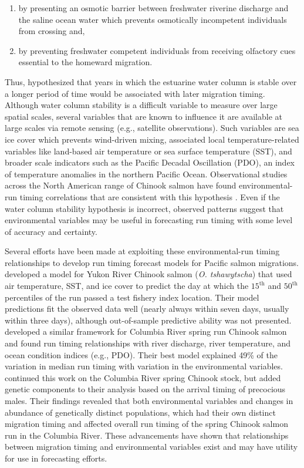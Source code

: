 \documentclass[12pt,]{book}
\providecommand{\tightlist}{%
  \setlength{\itemsep}{0pt}\setlength{\parskip}{0pt}}
\theoremstyle{definition}
\theoremstyle{definition}
\theoremstyle{definition}
\theoremstyle{remark}
\begin{document}
\begin{enumerate}
\def\labelenumi{(\arabic{enumi})}
\tightlist
\item
  by presenting an osmotic barrier between freshwater riverine discharge
  and the saline ocean water which prevents osmotically incompetent
  individuals from crossing and,
\item
  by preventing freshwater competent individuals from receiving
  olfactory cues essential to the homeward migration.
\end{enumerate}

\noindent
Thus, \citet{mundy-evenson-2011} hypothesized that years in which the
estuarine water column is stable over a longer period of time would be
associated with later migration timing. Although water column stability
is a difficult variable to measure over large spatial scales, several
variables that are known to influence it are available at large scales
via remote sensing (e.g., satellite observations). Such variables are
sea ice cover which prevents wind-driven mixing, associated local
temperature-related variables like land-based air temperature or sea
surface temperature (SST), and broader scale indicators such as the
Pacific Decadal Oscillation (PDO), an index of temperature anomalies in
the northern Pacific Ocean. Observational studies across the North
American range of Chinook salmon have found environmental-run timing
correlations that are consistent with this hypothesis
\citep{hodgson-etal-2006, keefer-etal-2008, mundy-evenson-2011}. Even if
the water column stability hypothesis is incorrect, observed patterns
suggest that environmental variables may be useful in forecasting run
timing with some level of accuracy and certainty.

Several efforts have been made at exploiting these environmental-run
timing relationships to develop run timing forecast models for Pacific
salmon migrations. \citet{mundy-evenson-2011} developed a model for
Yukon River Chinook salmon (\emph{O. tshawytscha}) that used air
temperature, SST, and ice cover to predict the day at which the
\(15^{\text{th}}\) and \(50^{\text{th}}\) percentiles of the run passed
a test fishery index location. Their model predictions fit the observed
data well (nearly always within seven days, usually within three days),
although out-of-sample predictive ability was not presented.
\citet{keefer-etal-2008} developed a similar framework for Columbia
River spring run Chinook salmon and found run timing relationships with
river discharge, river temperature, and ocean condition indices (e.g.,
PDO). Their best model explained 49\% of the variation in median run
timing with variation in the environmental variables.
\citet{anderson-beer-2009} continued this work on the Columbia River
spring Chinook stock, but added genetic components to their analysis
based on the arrival timing of precocious males. Their findings revealed
that both environmental variables and changes in abundance of
genetically distinct populations, which had their own distinct migration
timing and affected overall run timing of the spring Chinook salmon run
in the Columbia River. These advancements have shown that relationships
between migration timing and environmental variables exist and may have
utility for use in forecasting efforts.
\end{document}
